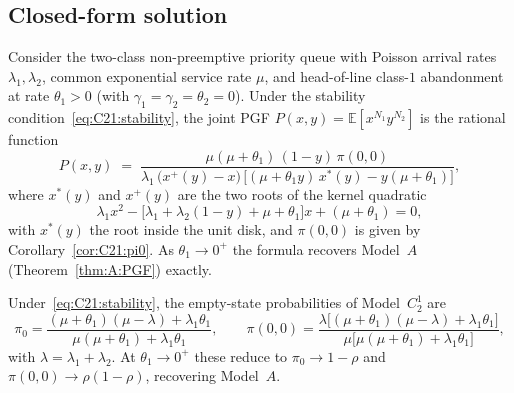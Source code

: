 \subsection{Closed-form solution}

\begin{theorem}\label{thm:C21:PGF}
Consider the two-class non-preemptive priority queue with Poisson arrival rates
$\lambda_1,\lambda_2$, common exponential service rate $\mu$, and head-of-line class-$1$
abandonment at rate $\theta_1>0$ (with $\gamma_1=\gamma_2=\theta_2=0$). Under the stability
condition~\eqref{eq:C21:stability}, the joint PGF $P(x,y)=\mathbb{E}[x^{N_1}y^{N_2}]$ is the
rational function
\begin{equation}
    P(x,y) \;=\;
    \frac{\mu(\mu+\theta_1)\,(1-y)\,\pi(0,0)}
    {\lambda_1\,\bigl(x^+(y)-x\bigr)
     \,\bigl[(\mu+\theta_1 y)\,x^*(y)-y(\mu+\theta_1)\bigr]},
    \label{eq:C21:PGF}
\end{equation}
where $x^*(y)$ and $x^+(y)$ are the two roots of the kernel quadratic
\begin{equation}
    \lambda_1 x^2 - \bigl[\lambda_1+\lambda_2(1-y)+\mu+\theta_1\bigr]x + (\mu+\theta_1) = 0,
    \label{eq:C21:quad}
\end{equation}
with $x^*(y)$ the root inside the unit disk, and $\pi(0,0)$ is given by
Corollary~\ref{cor:C21:pi0}. As $\theta_1\to0^+$ the formula recovers Model~$A$
(Theorem~\ref{thm:A:PGF}) exactly.
\end{theorem}

\begin{corollary}\label{cor:C21:pi0}
Under~\eqref{eq:C21:stability}, the empty-state probabilities of Model~$C_2^1$ are
\begin{equation}
    \pi_0 = \frac{(\mu+\theta_1)(\mu-\lambda)+\lambda_1\theta_1}
                 {\mu(\mu+\theta_1)+\lambda_1\theta_1},
    \qquad
    \pi(0,0) = \frac{\lambda\bigl[(\mu+\theta_1)(\mu-\lambda)+\lambda_1\theta_1\bigr]}
                    {\mu\bigl[\mu(\mu+\theta_1)+\lambda_1\theta_1\bigr]},
    \label{eq:C21:pi0_pi00}
\end{equation}
with $\lambda=\lambda_1+\lambda_2$. At $\theta_1\to0^+$ these reduce to $\pi_0\to1-\rho$ and
$\pi(0,0)\to\rho(1-\rho)$, recovering Model~$A$.
\end{corollary}

